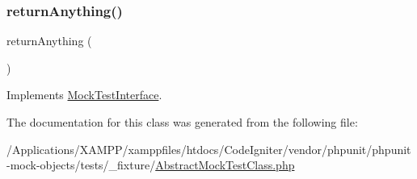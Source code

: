 \mbox{\label{class_abstract_mock_test_class_a92fcad527108f0c33114b9b5efcf54f2}} 
\subsubsection{\texorpdfstring{return\+Anything()}{returnAnything()}}
{\footnotesize\ttfamily return\+Anything (\begin{DoxyParamCaption}{ }\end{DoxyParamCaption})}



Implements \mbox{\hyperlink{interface_mock_test_interface_a92fcad527108f0c33114b9b5efcf54f2}{Mock\+Test\+Interface}}.



The documentation for this class was generated from the following file\+:\begin{DoxyCompactItemize}
\item 
/\+Applications/\+X\+A\+M\+P\+P/xamppfiles/htdocs/\+Code\+Igniter/vendor/phpunit/phpunit-\/mock-\/objects/tests/\+\_\+fixture/\mbox{\hyperlink{_abstract_mock_test_class_8php}{Abstract\+Mock\+Test\+Class.\+php}}\end{DoxyCompactItemize}
